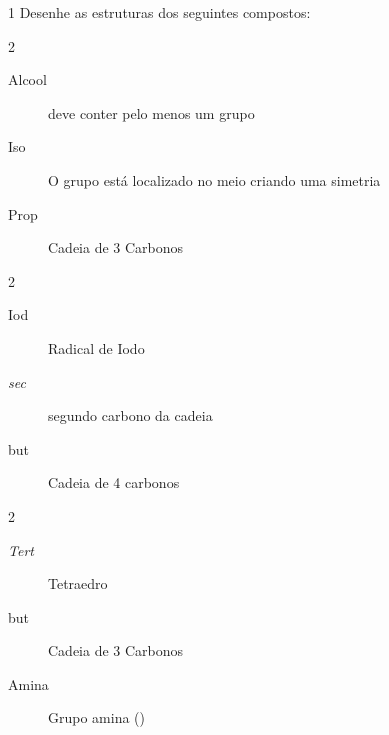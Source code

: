 \documentclass[\mainfilename]{subfiles}
\begin{document}
\begin{questionBox}1{ %
    Desenhe as estruturas dos seguintes compostos:
} %
    \begin{multicols}{2}
        
        \begin{questionBox}2{ %
        } %

            \begin{description}
                \item[Alcool] deve conter pelo menos um grupo 
                \item[Iso] O grupo está localizado no meio criando uma simetria
                \item[Prop] Cadeia de 3 Carbonos
            \end{description}
            \begin{center}
            \end{center}
        \end{questionBox}

        \begin{questionBox}2{ %
        } %
            \begin{description}
            \item[Iod] Radical de Iodo
            \item[\textit{sec}] segundo carbono da cadeia
            \item[but] Cadeia de 4 carbonos
            \end{description}


        \end{questionBox}

        \begin{questionBox}2{ %
        } %
            \begin{description}
            \item[\textit{Tert}] Tetraedro
            \item[but] Cadeia de 3 Carbonos
            \item[Amina] Grupo amina ()
            \end{description}


\end{questionBox}
\end{multicols}
\end{questionBox}
\end{document}
